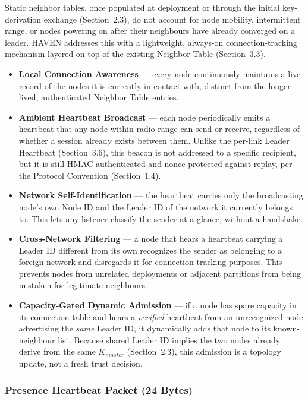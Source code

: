 \documentclass[11pt,a4paper]{article}
\begin{document}
Static neighbor tables, once populated at deployment or through the initial key-derivation exchange (Section~2.3), do not account for node mobility, intermittent range, or nodes powering on after their neighbours have already converged on a leader. HAVEN addresses this with a lightweight, always-on connection-tracking mechanism layered on top of the existing Neighbor Table (Section~3.3).

\begin{itemize}
\item \textbf{Local Connection Awareness} --- every node continuously maintains a live record of the nodes it is currently in contact with, distinct from the longer-lived, authenticated Neighbor Table entries.
\item \textbf{Ambient Heartbeat Broadcast} --- each node periodically emits a heartbeat that any node within radio range can send or receive, regardless of whether a session already exists between them. Unlike the per-link Leader Heartbeat (Section~3.6), this beacon is not addressed to a specific recipient, but it is still HMAC-authenticated and nonce-protected against replay, per the Protocol Convention (Section~1.4).
\item \textbf{Network Self-Identification} --- the heartbeat carries only the broadcasting node's own Node ID and the Leader ID of the network it currently belongs to. This lets any listener classify the sender at a glance, without a handshake.
\item \textbf{Cross-Network Filtering} --- a node that hears a heartbeat carrying a Leader ID different from its own recognizes the sender as belonging to a foreign network and disregards it for connection-tracking purposes. This prevents nodes from unrelated deployments or adjacent partitions from being mistaken for legitimate neighbours.
\item \textbf{Capacity-Gated Dynamic Admission} --- if a node has spare capacity in its connection table and hears a \emph{verified} heartbeat from an unrecognized node advertising the \emph{same} Leader ID, it dynamically adds that node to its known-neighbour list. Because shared Leader ID implies the two nodes already derive from the same $K_{master}$ (Section~2.3), this admission is a topology update, not a fresh trust decision.
\end{itemize}

\subsubsection*{Presence Heartbeat Packet (24 Bytes)}
\end{document}
